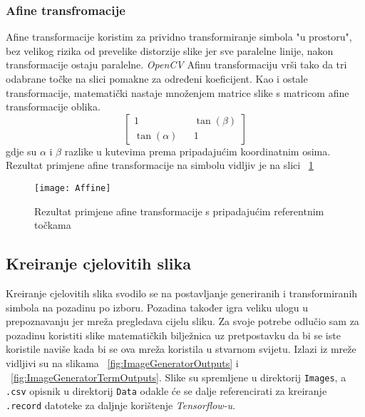 \subsubsection{Afine transfromacije}
Afine transformacije koristim za prividno transformiranje simbola "u prostoru", bez velikog rizika od prevelike distorzije slike jer sve paralelne linije, nakon transformacije ostaju paralelne.
\emph{OpenCV} Afinu transformaciju vrši tako da tri odabrane točke na slici pomakne za određeni koeficijent.
Kao i ostale transformacije, matematički nastaje množenjem matrice slike s matricom afine transformacije oblika.
$$
\begin{bmatrix}
	1 && \tan(\beta) \\
	\tan(\alpha) && 1
\end{bmatrix}
$$
gdje su $\alpha$ i $\beta$ razlike u kutevima prema pripadajućim koordinatnim osima.
Rezultat primjene afine transformacije na simbolu vidljiv je na slici ~\ref{fig:Affine}
\lstset{numbers=left}

\begin{figure}[h!]
	\centering
	\texttt{[image: Affine]}
	 \caption{Rezultat primjene afine transformacije s pripadajućim referentnim točkama}
 	 \label{fig:Affine}
\end{figure}

\subsection{Kreiranje cjelovitih slika}
Kreiranje cjelovitih slika svodilo se na postavljanje generiranih i transformiranih simbola na pozadinu po izboru.
Pozadina također igra veliku ulogu u prepoznavanju jer mreža pregledava cijelu sliku. 
Za svoje potrebe odlučio sam za pozadinu koristiti slike matematičkih bilježnica uz pretpostavku da bi se iste koristile naviše kada bi se ova mreža koristila u stvarnom svijetu.
Izlazi iz mreže vidljivi su na slikama ~\ref{fig:ImageGeneratorOutputs} i ~\ref{fig:ImageGeneratorTermOutputs}.
Slike su spremljene u direktorij \texttt{Images}, a \texttt{.csv} opisnik u direktorij \texttt{Data} odakle će se dalje referencirati za kreiranje \texttt{.record} datoteke za daljnje korištenje \emph{Tensorflow-u}.
\begin{figure}

\end{figure}

